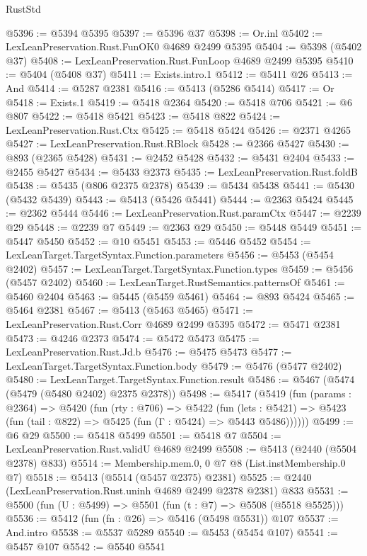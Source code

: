 \begin{lexlean}{RustStd}
\begin{coremodule}
@5396 := @5394 @5395
@5397 := @5396 @37
@5398 := Or.inl
@5402 := LexLeanPreservation.Rust.FunOK0 @4689 @2499 @5395
@5404 := @5398 (@5402 @37)
@5408 := LexLeanPreservation.Rust.FunLoop @4689 @2499 @5395
@5410 := @5404 (@5408 @37)
@5411 := Exists.intro.{1}
@5412 := @5411 @26
@5413 := And
@5414 := @5287 @2381
@5416 := @5413 (@5286 @5414)
@5417 := Or
@5418 := Exists.{1}
@5419 := @5418 @2364
@5420 := @5418 @706
@5421 := @6 @807
@5422 := @5418 @5421
@5423 := @5418 @822
@5424 := LexLeanPreservation.Rust.Ctx
@5425 := @5418 @5424
@5426 := @2371 @4265
@5427 := LexLeanPreservation.Rust.RBlock
@5428 := @2366 @5427
@5430 := @893 (@2365 @5428)
@5431 := @2452 @5428
@5432 := @5431 @2404
@5433 := @2455 @5427
@5434 := @5433 @2373
@5435 := LexLeanPreservation.Rust.foldB
@5438 := @5435 (@806 @2375 @2378)
@5439 := @5434 @5438
@5441 := @5430 (@5432 @5439)
@5443 := @5413 (@5426 @5441)
@5444 := @2363 @5424
@5445 := @2362 @5444
@5446 := LexLeanPreservation.Rust.paramCtx
@5447 := @2239 @29
@5448 := @2239 @7
@5449 := @2363 @29
@5450 := @5448 @5449
@5451 := @5447 @5450
@5452 := @10 @5451
@5453 := @5446 @5452
@5454 := LexLeanTarget.TargetSyntax.Function.parameters
@5456 := @5453 (@5454 @2402)
@5457 := LexLeanTarget.TargetSyntax.Function.types
@5459 := @5456 (@5457 @2402)
@5460 := LexLeanTarget.RustSemantics.patternsOf
@5461 := @5460 @2404
@5463 := @5445 (@5459 @5461)
@5464 := @893 @5424
@5465 := @5464 @2381
@5467 := @5413 (@5463 @5465)
@5471 := LexLeanPreservation.Rust.Corr @4689 @2499 @5395
@5472 := @5471 @2381
@5473 := @4246 @2373
@5474 := @5472 @5473
@5475 := LexLeanPreservation.Rust.Jd.b
@5476 := @5475 @5473
@5477 := LexLeanTarget.TargetSyntax.Function.body
@5479 := @5476 (@5477 @2402)
@5480 := LexLeanTarget.TargetSyntax.Function.result
@5486 := @5467 (@5474 (@5479 (@5480 @2402) @2375 @2378))
@5498 := @5417
    (@5419
      (fun (params : @2364) =>
      @5420
        (fun (rty : @706) =>
        @5422
          (fun (lets : @5421) =>
          @5423 (fun (tail : @822) => @5425 (fun (Γ : @5424) => @5443 @5486))))))
@5499 := @6 @29
@5500 := @5418 @5499
@5501 := @5418 @7
@5504 := LexLeanPreservation.Rust.validU @4689 @2499
@5508 := @5413 (@2440 (@5504 @2378) @833)
@5514 := Membership.mem.{0, 0} @7 @8 (List.instMembership.{0} @7)
@5518 := @5413 (@5514 (@5457 @2375) @2381)
@5525 := @2440 (LexLeanPreservation.Rust.uninh @4689 @2499 @2378 @2381) @833
@5531 := @5500 (fun (U : @5499) => @5501 (fun (t : @7) => @5508 (@5518 @5525)))
@5536 := @5412 (fun (fn : @26) => @5416 (@5498 @5531)) @107
@5537 := And.intro
@5538 := @5537 @5289
@5540 := @5453 (@5454 @107)
@5541 := @5457 @107
@5542 := @5540 @5541

\end{coremodule}
\end{lexlean}
